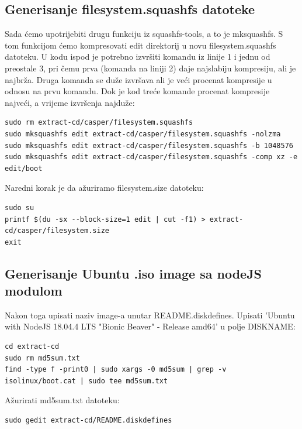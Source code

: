 \documentclass[12pt,vi]{mitthesis}
\begin{document}
\subsection*{Generisanje filesystem.squashfs datoteke}
\noindent
Sada ćemo upotrijebiti drugu funkciju iz squashfs-tools, a to je mksquashfs. S tom funkcijom ćemo kompresovati edit direktorij u novu filesystem.squashfs datoteku. U kodu ispod je potrebno izvršiti komandu iz linije 1 i jednu od preostale 3, pri čemu prva (komanda na liniji 2) daje najslabiju kompresiju, ali je najbrža. Druga komanda se duže izvršava ali je veći procenat kompresije u odnosu na prvu komandu. Dok je kod treće komande procenat kompresije najveći, a vrijeme izvršenja najduže:
\begin{lstlisting}[style=BashInputStyle]
sudo rm extract-cd/casper/filesystem.squashfs
sudo mksquashfs edit extract-cd/casper/filesystem.squashfs -nolzma 
sudo mksquashfs edit extract-cd/casper/filesystem.squashfs -b 1048576
sudo mksquashfs edit extract-cd/casper/filesystem.squashfs -comp xz -e edit/boot
\end{lstlisting}

\noindent
Naredni korak je da ažuriramo filesystem.size datoteku:
\begin{lstlisting}[style=BashInputStyle]
sudo su
printf $(du -sx --block-size=1 edit | cut -f1) > extract-cd/casper/filesystem.size
exit
\end{lstlisting}

\subsection*{Generisanje Ubuntu .iso image sa nodeJS modulom}
\noindent
Nakon toga upisati naziv image-a unutar README.diskdefines. 
Upisati 'Ubuntu with NodeJS 18.04.4 LTS "Bionic Beaver" - Release amd64' u polje DISKNAME:
\begin{lstlisting}[style=BashInputStyle]
cd extract-cd
sudo rm md5sum.txt
find -type f -print0 | sudo xargs -0 md5sum | grep -v isolinux/boot.cat | sudo tee md5sum.txt
\end{lstlisting}

\noindent
Ažurirati md5sum.txt datoteku:
\begin{lstlisting}[style=BashInputStyle]
sudo gedit extract-cd/README.diskdefines
\end{lstlisting}
\end{document}
